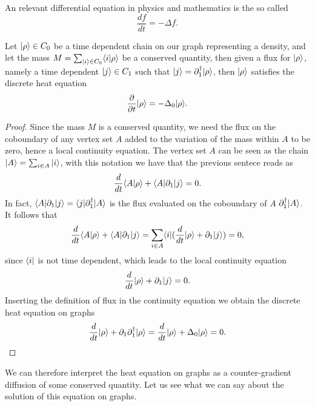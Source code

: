 \documentclass[../2.tex]{subfiles}
\begin{document}
    An relevant differential equation in physics and mathematics is the so called 
    \[ \frac{df}{dt} = -\Delta f . \]
    \begin{prop}
        Let $| \rho \rangle \in C_0$ be a time dependent chain on our graph representing a density, and let the mass $M = \sum_{| i \rangle\in C_0} \langle i | \rho \rangle$ be 
        a conserved quantity, then given a flux for $| \rho \rangle$, namely a time dependent $| j \rangle \in C_1$ such that
        $| j \rangle = \partial_1^\dagger | \rho \rangle$, then $| \rho \rangle$ satisfies the discrete heat equation
        \[ \frac{\partial}{\partial t} | \rho \rangle = -\Delta_0 | \rho \rangle. \]
    \end{prop}
    \begin{proof}
        Since the mass $M$ is a conserved quantity, we need the flux on the coboundary of any vertex set $A$ added to the variation of 
        the mass within $A$ to be zero, hence a local continuity equation.
        The vertex set $A$ can be seen as the chain $| A \rangle = \sum_{i \in A}| i \rangle$, with this notation we have that
        the previous sentece reads as
        \[ \frac{d}{dt}\langle A | \rho \rangle + \langle A |\partial_1| j \rangle = 0 . \]
        In fact, $\langle A |\partial_1| j \rangle=\langle j |\partial_1^\dagger| A \rangle$ is the flux evaluated on the coboundary of $A$ $\partial_1^\dagger| A \rangle$.\\
        It follows that 
        \[ \frac{d}{dt}\langle A | \rho \rangle + \langle A |\partial_1| j \rangle = \sum_{i \in A}\langle i |(\frac{d}{dt}| \rho \rangle+\partial_1| j \rangle) = 0, \]
        since $\langle i |$ is not time dependent, which leads to the local continuity equation 
        \[ \frac{d}{dt}| \rho \rangle+\partial_1| j \rangle = 0. \]
        Inserting the definition of flux in the continuity equation we obtain the discrete heat equation on graphs
        \[ \frac{d}{dt}| \rho \rangle+\partial_1\partial_1^\dagger | \rho \rangle = \frac{d}{dt}| \rho \rangle+\Delta_0 | \rho \rangle = 0.\]\qedhere    
    \end{proof}
    
    We can therefore interpret the heat equation on graphs as a counter-gradient diffusion of some conserved quantity.
    Let us see what we can say about the solution of this equation on graphs.
\end{document}
